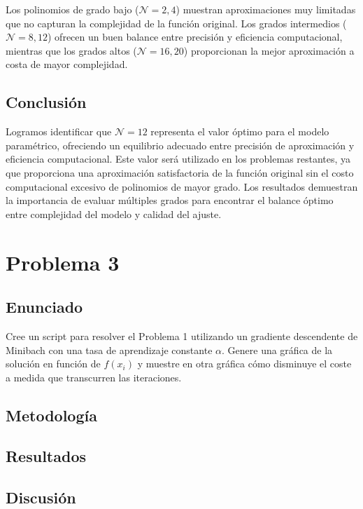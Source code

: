 \documentclass{article}
\begin{document}
Los polinomios de grado bajo ($\mathcal{N} = 2, 4$) muestran aproximaciones muy limitadas que no capturan la complejidad de la función original. Los grados intermedios ($\mathcal{N} = 8, 12$) ofrecen un buen balance entre precisión y eficiencia computacional, mientras que los grados altos ($\mathcal{N} = 16, 20$) proporcionan la mejor aproximación a costa de mayor complejidad.

\subsection{Conclusión}

Logramos identificar que $\mathcal{N} = 12$ representa el valor óptimo para el modelo paramétrico, ofreciendo un equilibrio adecuado entre precisión de aproximación y eficiencia computacional. Este valor será utilizado en los problemas restantes, ya que proporciona una aproximación satisfactoria de la función original sin el costo computacional excesivo de polinomios de mayor grado. Los resultados demuestran la importancia de evaluar múltiples grados para encontrar el balance óptimo entre complejidad del modelo y calidad del ajuste.

\section{Problema 3}

\subsection{Enunciado}

Cree un script para resolver el Problema 1 utilizando un gradiente descendente de Minibach con una tasa de aprendizaje constante $\alpha$. Genere una gráfica de la solución en función de $f(x_i)$ y muestre en otra gráfica cómo disminuye el coste a medida que transcurren las iteraciones.

\subsection{Metodología}

\subsection{Resultados}
\setcounter{equation}{0}

\subsection{Discusión}
\end{document}
